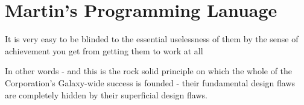 \chapter{Martin's Programming Lanuage}
It is very easy to be blinded to the essential uselessness of them by the sense of achievement you get from getting them to work at all

In other words - and this is the rock solid principle on which the whole of the Corporation's Galaxy-wide success is founded - their fundamental design flaws are completely hidden by their superficial design flaws. 


